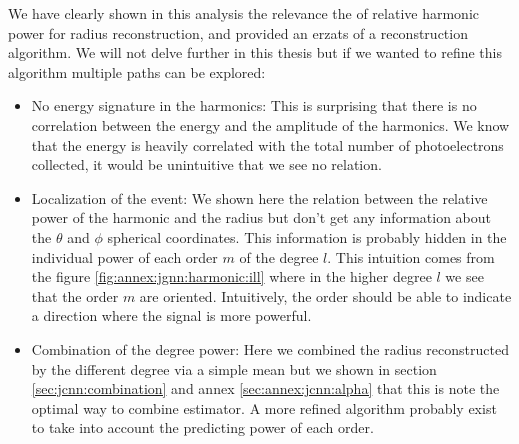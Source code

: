 \documentclass[../main.tex]{subfiles}
\begin{document}
We have clearly shown in this analysis the relevance the of relative harmonic power for radius reconstruction, and provided an erzats of a reconstruction algorithm. We will not delve further in this thesis but if we wanted to refine this algorithm multiple paths can be explored:
\begin{itemize}
  \item No energy signature in the harmonics: This is surprising that there is no correlation between the energy and the amplitude of the harmonics. We know that the energy is heavily correlated with the total number of photoelectrons collected, it would be unintuitive that we see no relation.
  \item Localization of the event: We shown here the relation between the relative power of the harmonic and the radius but don't get any information about the $\theta$ and $\phi$ spherical coordinates. This information is probably hidden in the individual power of each order $m$ of the degree $l$. This intuition comes from the figure \ref{fig:annex:jgnn:harmonic:ill} where in the higher degree $l$ we see that the order $m$ are oriented. Intuitively, the order should be able to indicate a direction where the signal is more powerful.
  \item Combination of the degree power: Here we combined the radius reconstructed by the different degree via a simple mean but we shown in section \ref{sec:jcnn:combination} and annex \ref{sec:annex:jcnn:alpha} that this is note the optimal way to combine estimator. A more refined algorithm probably exist to take into account the predicting power of each order.
\end{itemize}
\end{document}

